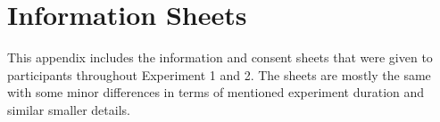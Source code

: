 \chapter{Information Sheets}\label{app:informationconsent}
This appendix includes the information and consent sheets that were given to participants throughout Experiment 1 and 2. The sheets are mostly the same with some minor differences in terms of mentioned experiment duration and similar smaller details.  


